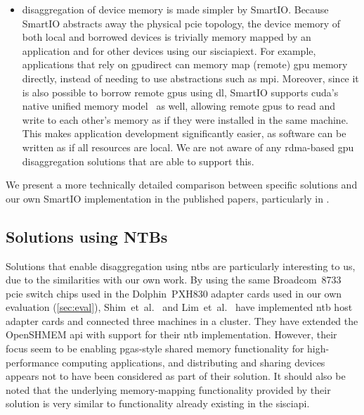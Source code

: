 \begin{itemize}
    \item \Gls{disaggregation} of device memory is made simpler by SmartIO.
        Because SmartIO abstracts away the physical \gls{pcie} topology, the device memory of both local and borrowed devices is trivially memory mapped by an application and for other devices using our \gls{sisciapiext}.
        For example, applications that rely on \gls{gpudirect} can memory map (remote) \gls{gpu} memory directly, instead of needing to use abstractions such as \gls{mpi}.
        Moreover, since it is also possible to borrow remote \glspl{gpu} using \gls{dl}, SmartIO supports \gls{cuda}'s native unified memory model~\cite{url:unified-memory} as well, allowing remote \glspl{gpu} to read and write to each other's memory as if they were installed in the same machine.
        This makes application development significantly easier, as software can be written as if all resources are local.
        We are not aware of any \gls{rdma}-based \gls{gpu} disaggregation solutions that are able to support this.

\end{itemize}

We present a more technically detailed comparison between specific solutions and our own SmartIO implementation in the published papers, particularly in .


\subsection{Solutions using NTBs}
Solutions that enable \gls{disaggregation} using \glspl{ntb} are particularly interesting to us, due to the similarities with our own work.
%
By using the same Broadcom~8733~\cite{pex8733} \gls{pcie} switch chips used in the Dolphin~PXH830 adapter cards used in our own evaluation (\cref{sec:eval}), Shim~et~al.~\cite{Shim2018} and Lim~et~al.~\cite{Lim2019} have implemented \gls{ntb} host adapter cards and connected three machines in a cluster.
%
They have extended the OpenSHMEM \gls{api} with support for their \gls{ntb} implementation.
%
However, their focus seem to be enabling \gls{pgas}-style shared memory functionality for high-performance computing applications, and distributing and sharing devices appears not to have been considered as part of their solution.
%
It should also be noted that the underlying memory-mapping functionality provided by their solution is very similar to functionality already existing in the \gls{sisciapi}.



